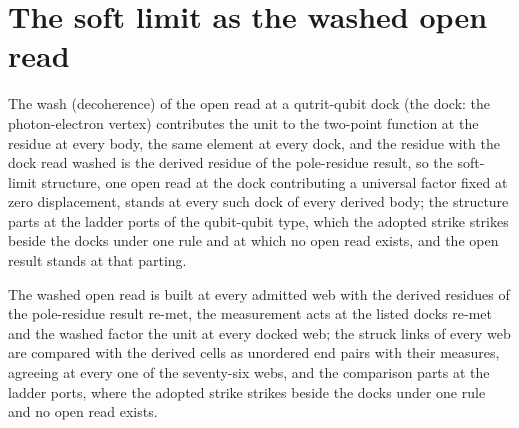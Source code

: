 \section{The soft limit as the washed open read}\label{mod:I-3-D534981-w-sftp}
\begin{chwall}\label{box:I-3-D534981-w-sftp:1}
The wash (decoherence) of the open read at a qutrit-qubit dock (the dock: the photon-electron vertex) contributes the unit to the two-point function at the residue at every body, the same element at every dock, and the residue with the dock read washed is the derived residue of the pole-residue result, so the soft-limit structure, one open read at the dock contributing a universal factor fixed at zero displacement, stands at every such dock of every derived body; the structure parts at the ladder ports of the qubit-qubit type, which the adopted strike strikes beside the docks under one rule and at which no open read exists, and the open result stands at that parting.
\end{chwall}
The washed open read is built at every admitted web with the derived residues of the pole-residue result re-met, the measurement acts at the listed docks re-met and the washed factor the unit at every docked web; the struck links of every web are compared with the derived cells as unordered end pairs with their measures, agreeing at every one of the seventy-six webs, and the comparison parts at the ladder ports, where the adopted strike strikes beside the docks under one rule and no open read exists.

